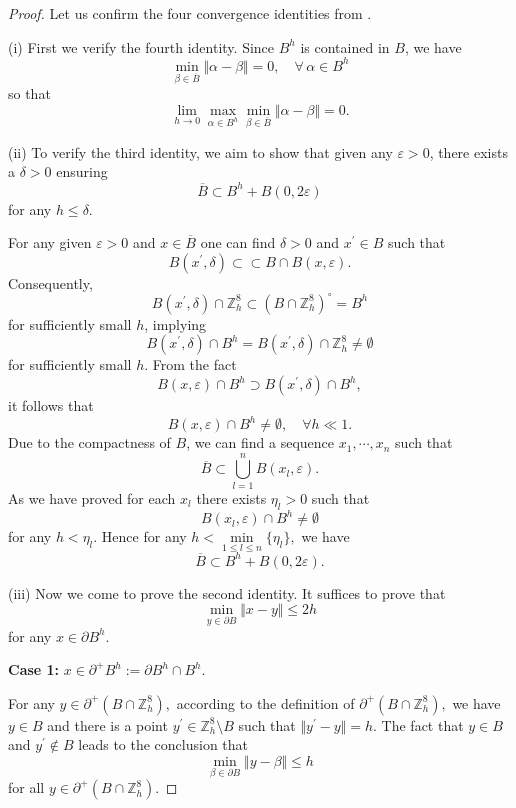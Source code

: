 \documentclass{amsart}
\theoremstyle{definition}
\theoremstyle{remark}
\numberwithin{equation}{section}
\newcommand{\p}{\partial}
\newcommand{\Z}{\mathbb Z}
\begin{document}
\begin{proof} Let us  confirm the four convergence identities from .

    \bigskip
    (i) First we verify the fourth identity. Since $B^h$ is contained in $B$, we have \begin{equation*}
        \min_{\beta\in \overline B } \Vert \alpha-\beta\Vert=0, \quad \forall \,\alpha\in B^h
    \end{equation*}
    so that  \[
\lim_{h\to 0} \max_{\alpha\in B^h }\min_{\beta\in \overline B } \Vert \alpha-\beta\Vert=0.
\]

    \bigskip

    (ii) To verify the third identity, we aim to show that given any $\varepsilon>0$, there exists a $\delta>0$ ensuring \[
\overline B \subset B^h + B(0, 2\varepsilon	)
\]   for any $h \leqslant \delta$.

    For any given 	$\varepsilon>0$ and $x \in \overline  B$ one can find $\delta > 0$ and $x^\prime \in  B$ such that \[
B(x^\prime,\delta ) \subset\subset B \cap B(x, \varepsilon	).
\]
    Consequently,
    \[
B(x^\prime,\delta) \cap \Z^8_h \subset  (B \cap \Z^8_h)^\circ  = B^h
\]
     for sufficiently small
  $h$, implying
     \[
B(x^\prime,\delta) \cap B^h = B(x^\prime,\delta) \cap \Z^8_h \neq \emptyset
\] for sufficiently small
     $h$.    From the fact \[
B(x,\varepsilon 	) \cap B^h \supset B(x^\prime,\delta) \cap B^h,
\] it follows that \begin{equation}
        \label{2023-09-11 16:15:35}
        B(x,\varepsilon 	) \cap B^h \neq \emptyset,\quad \forall h\ll 1.
    \end{equation}
    Due to the compactness of $B$, we can find a sequence $x_1,\cdots,x_n$ such that
    \[
\overline B\subset \bigcup\limits_{l=1}^n B(x_l,\varepsilon).
\] As we have proved for each $x_l$ there exists $\eta_l > 0$ such that \[
B(x_l,\varepsilon)\cap B^h  \neq \emptyset
\] for any $h<\eta_l.$ Hence for any $h<\min\limits_{1\leqslant l\leqslant n}\{\eta_l\},$ we have  \[
\overline B \subset B^h + B(0, 2\varepsilon	).
\]
    \bigskip

    (iii) Now we come to prove the second identity. It suffices to prove that \[
\min_{y\in \p B} \Vert x-y\Vert \leqslant 2h
\] for any  $x\in \p B^h$.

    {\bf Case 1:}  $x\in \p^+ B^h:= \p B^h\cap B^h.$

    \bigskip
    For any $y\in \p^+(B\cap \Z^8_h),$ according to the definition of $\p^+(B\cap \Z^8_h),$ we have $y \in B$ and there is a point $y^\prime \in \Z^8_h\setminus B$ such that $\Vert y^\prime-y \Vert = h.$ The fact that $y \in B$ and $y^\prime \notin  B$ leads to the conclusion that \[
\mathop{\min}\limits_{\beta \in \p B}\Vert y-\beta \Vert \leqslant h
\]
   for all  $y\in \p^+(B\cap \Z^8_h)$.







\end{proof}
\end{document}
